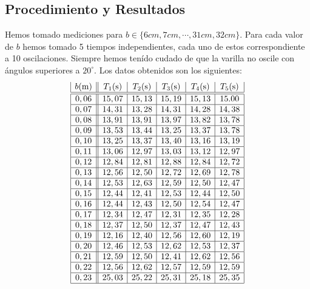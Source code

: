 \documentclass{article}
\begin{document}
\begin{multicols}{2}
\section{Procedimiento y Resultados}
Hemos tomado mediciones para $b\in \{6cm, 7cm, \cdots, 31cm, 32cm\}$. Para cada valor de $b$ hemos tomado 5 tiempos independientes, cada uno de estos correspondiente a 10 oscilaciones. Siempre hemos tenído cudado de que la varilla no oscile con ángulos superiores a $20^\circ$. Los datos obtenidos son los siguientes:
$$
    \begin{array}{|c||c|c|c|c|c|}
        b\text{(m)} & T_1\text{(s)} & T_2\text{(s)} & T_3\text{(s)} & T_4\text{(s)} & T_5\text{(s)} \\ \hline\hline
        0,06 & 15,07 & 15,13 & 15,19 & 15,13 & 15.00 \\ \hline
        0,07 & 14,31 & 13,28 & 14,31 & 14,28 & 14,38 \\ \hline
        0,08 & 13,91 & 13,91 & 13,97 & 13,82 & 13,78 \\ \hline
        0,09 & 13,53 & 13,44 & 13,25 & 13,37 & 13,78 \\ \hline
        0,10 & 13,25 & 13,37 & 13,40 & 13,16 & 13,19 \\ \hline
        0,11 & 13,06 & 12,97 & 13,03 & 13,12 & 12,97 \\ \hline
        0,12 & 12,84 & 12,81 & 12,88 & 12,84 & 12,72 \\ \hline
        0,13 & 12,56 & 12,50 & 12,72 & 12,69 & 12,78 \\ \hline
        0,14 & 12,53 & 12,63 & 12,59 & 12,50 & 12,47 \\ \hline
        0,15 & 12,44 & 12,41 & 12,53 & 12,44 & 12,50 \\ \hline
        0,16 & 12,44 & 12,43 & 12,50 & 12,54 & 12,47 \\ \hline
        0,17 & 12,34 & 12,47 & 12,31 & 12,35 & 12,28 \\ \hline
        0,18 & 12,37 & 12,50 & 12,37 & 12,47 & 12,43 \\ \hline
        0,19 & 12,16 & 12,40 & 12,56 & 12,60 & 12,19 \\ \hline
        0,20 & 12,46 & 12,53 & 12,62 & 12,53 & 12,37 \\ \hline
        0,21 & 12,59 & 12,50 & 12,41 & 12,62 & 12,56 \\ \hline
        0,22 & 12,56 & 12,62 & 12,57 & 12,59 & 12,59 \\ \hline
        0,23 & 25,03 & 25,22 & 25,31 & 25,18 & 25,35 \\ \hline

\end{array}$$
\end{multicols}
\end{document}
